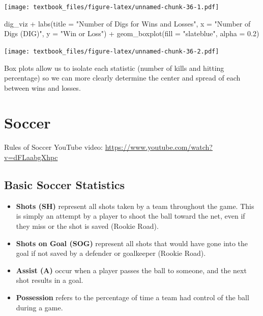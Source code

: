 \documentclass[
  11pt,
]{book}
\newenvironment{Shaded}{\begin{snugshade}}{\end{snugshade}}
\newcommand{\AttributeTok}[1]{\textcolor[rgb]{0.77,0.63,0.00}{#1}}
\newcommand{\FloatTok}[1]{\textcolor[rgb]{0.00,0.00,0.81}{#1}}
\newcommand{\FunctionTok}[1]{\textcolor[rgb]{0.00,0.00,0.00}{#1}}
\newcommand{\NormalTok}[1]{#1}
\newcommand{\SpecialCharTok}[1]{\textcolor[rgb]{0.00,0.00,0.00}{#1}}
\newcommand{\StringTok}[1]{\textcolor[rgb]{0.31,0.60,0.02}{#1}}
\theoremstyle{definition}
\theoremstyle{definition}
\theoremstyle{definition}
\theoremstyle{definition}
\theoremstyle{remark}
\begin{document}
\texttt{[image: textbook\_files/figure-latex/unnamed-chunk-36-1.pdf]}

\begin{Shaded}
\begin{Highlighting}[]
\NormalTok{dig\_viz }\SpecialCharTok{+}
  \FunctionTok{labs}\NormalTok{(}\AttributeTok{title =} \StringTok{"Number of Digs for Wins and Losses"}\NormalTok{,}
       \AttributeTok{x =} \StringTok{"Number of Digs (DIG)"}\NormalTok{,}
       \AttributeTok{y =} \StringTok{"Win or Loss"}\NormalTok{) }\SpecialCharTok{+}
  \FunctionTok{geom\_boxplot}\NormalTok{(}\AttributeTok{fill =} \StringTok{"slateblue"}\NormalTok{, }\AttributeTok{alpha =} \FloatTok{0.2}\NormalTok{)}
\end{Highlighting}
\end{Shaded}

\texttt{[image: textbook\_files/figure-latex/unnamed-chunk-36-2.pdf]}

Box plots allow us to isolate each statistic (number of kills and hitting percentage) so we can more clearly determine the center and spread of each between wins and losses.

\newpage

\hypertarget{soccer}{%
\section{Soccer}\label{soccer}}

Rules of Soccer YouTube video: \url{https://www.youtube.com/watch?v=dFLaabgXhpc}

\hypertarget{basic-soccer-statistics}{%
\subsection{Basic Soccer Statistics}\label{basic-soccer-statistics}}

\begin{itemize}
\item
  \textbf{Shots (SH)} represent all shots taken by a team throughout the game. This is simply an attempt by a player to shoot the ball toward the net, even if they miss or the shot is saved (Rookie Road).
\item
  \textbf{Shots on Goal (SOG)} represent all shots that would have gone into the goal if not saved by a defender or goalkeeper (Rookie Road).
\item
  \textbf{Assist (A)} occur when a player passes the ball to someone, and the next shot results in a goal.
\item
  \textbf{Possession} refers to the percentage of time a team had control of the ball during a game.
\end{itemize}
\end{document}
